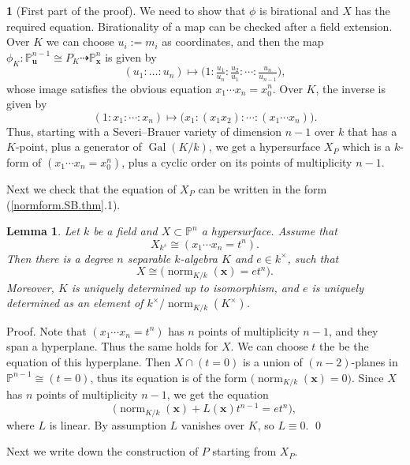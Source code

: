 \documentclass{amsart}
\newtheorem{lem}[thm]{Lemma}
\theoremstyle{definition}
\newtheorem{say}[thm]{}
\theoremstyle{remark}
\newcommand{\p}[0]{{\mathbb P}}
\newcommand{\map}[0]{\dasharrow}
\newcommand{\gal}[0]{\operatorname{Gal}}
\newcommand{\norm}[0]{\operatorname{norm}}
\begin{document}
\begin{say}[First part of the proof]
We need to show that $\phi$ is birational and $X$ has the required equation.
Birationality of a map can be checked after a field extension.
Over $K$ we can choose  $u_i:=m_i$ as coordinates, and then the map $\phi_K:\p^{n-1}_{\mathbf u}\cong P_K\map \p^n_{\mathbf x}$ 
is given by
$$
(u_1{:}\dots{:}u_n) \mapsto 
\bigl(1{:}\tfrac{u_1}{u_n}{:}\tfrac{u_2}{u_1}{:} \cdots{:}\tfrac{u_n}{u_{n-1}} 
\bigr),
$$
whose image satisfies the obvious equation
$x_1\cdots x_n=x_0^n$. Over $K$, the inverse is given by
$$
(1{:}x_1{:}\cdots {:} x_n)\mapsto
\bigl(x_1{:}(x_1x_2){:}\cdots {:} (x_1\cdots x_{n})\bigr).
$$
Thus, starting with a  Severi--Brauer variety of dimension $n-1$ over $k$ that has a $K$-point, plus a generator of $\gal(K/k)$, we get a
hypersurface  $X_P$ which is a $k$-form of $(x_1\cdots x_n=x_0^n)$, plus a cyclic 
order on its points of multiplicity $n-1$.

 Next we check that the equation of $X_P$ can be written  in the form (\ref{normform.SB.thm}.1).
\end{say}



\begin{lem}\label{SB.hyper.arith.say.1} Let $k$ be a field and 
$X\subset \p^n$ a hypersurface. Assume that
$$
X_{k^s}\cong (x_1\cdots x_n=t^n).
$$
Then there is a degree $n$ separable $k$-algebra $K$ and $e\in k^{\times}$, such that
$$
X\cong \bigl(\norm_{K/k}({\mathbf x})=et^n\bigr).
$$
Moreover, $K$ is uniquely determined up to isomorphism, and
$e$ is  uniquely determined as an element of
$k^{\times}/\norm_{K/k}(K^{\times})$. 
\end{lem}

Proof.  Note that $(x_1\cdots x_n=t^n)$ has $n$ points of multiplicity $n-1$, and they span a hyperplane. Thus the same holds for $X$.
We can choose $t$ the be the equation of this hyperplane.
Then $X\cap (t=0)$ is a union of   $(n-2)$-planes in $\p^{n-1}\cong (t=0)$, thus its equation is of the form $\bigl(\norm_{K/k}({\mathbf x})=0\bigr)$.  Since $X$ has $n$ points of multiplicity $n-1$, we get the equation
$$
\bigl(\norm_{K/k}({\mathbf x})+L({\mathbf x})t^{n-1}=et^n\bigr),
$$
where $L$ is linear. By assumption $L$ vanishes over $K$, so $L\equiv 0$. \qed


\medskip
Next we write down the construction of $P$ starting from $X_P$.
\end{document}
